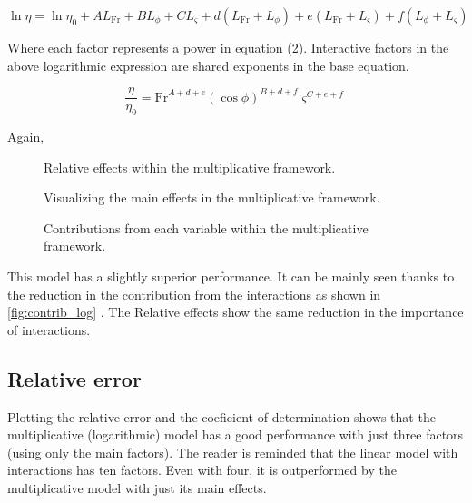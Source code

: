 \documentclass[a4paper,11pt]{article}
\begin{document}
\[\ln\eta = \ln\eta_0 + A L_\mathrm{Fr} + B L_\phi + C L_\varsigma + d\left( L_\mathrm{Fr} +  L_\phi\right) + e\left(L_\mathrm{Fr} +  L_\varsigma\right) + f\left( L_\phi +  L_\varsigma\right)\]

Where each factor represents a power in equation (2). Interactive
factors in the above logarithmic expression are shared exponents in the
base equation.

\[\frac{\eta}{\eta_0} = \mathrm{Fr}^{A+d+e} \left(\cos\phi\right)^{B+d+f} \varsigma^{C+e+f}\]

Again,

\begin{figure}
\hypertarget{fig:effects_log}{%
\centering

\caption{Relative effects within the multiplicative
framework.}\label{fig:effects_log}
}
\end{figure}

\begin{figure}
\hypertarget{fig:planes_log}{%
\centering

\caption{Visualizing the main effects in the multiplicative
framework.}\label{fig:planes_log}
}
\end{figure}

\begin{figure}
\hypertarget{fig:contrib_log}{%
\centering

\caption{Contributions from each variable within the multiplicative
framework.}\label{fig:contrib_log}
}
\end{figure}

This model has a slightly superior performance. It can be mainly seen
thanks to the reduction in the contribution from the interactions as
shown in \autoref{fig:contrib_log} . The Relative effects show the same
reduction in the importance of interactions.

\hypertarget{relative-error}{%
\subsection{Relative error}\label{relative-error}}

Plotting the relative error and the coeficient of determination shows
that the multiplicative (logarithmic) model has a good performance with
just three factors (using only the main factors). The reader is reminded
that the linear model with interactions has ten factors. Even with four,
it is outperformed by the multiplicative model with just its main
effects.
\end{document}
